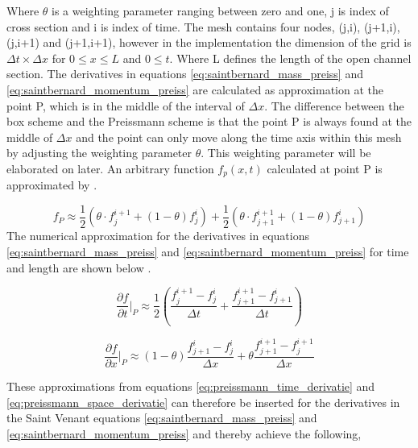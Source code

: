 Where $\theta$ is a weighting parameter ranging between zero and one, j is index of cross section and i is index of time. The mesh contains four nodes, (j,i), (j+1,i), (j,i+1) and (j+1,i+1), however in the implementation the dimension of the grid is $\Delta t \times \Delta x$ for $0 \leq x \leq L$ and $0\leq t$. Where L defines the length of the open channel section. The derivatives in equations \ref{eq:saintbernard_mass_preiss} and \ref{eq:saintbernard_momentum_preiss} are calculated as approximation at the point P, which is in the middle of the interval of $\Delta x$.%
The difference between the box scheme and the Preissmann scheme is that the point P is always found at the middle of $\Delta x$ and the point can only move along the time axis within this mesh by adjusting the weighting parameter $\theta$. This weighting parameter will be elaborated on later. An arbitrary function $f_p(x,t)$ calculated at point P is approximated by \cite{numerical_modeling}.

\begin{equation}\label{eq:approximated_function}
	f_P \approx \frac{1}{2} (\theta \cdot f_j^{i+1}+(1-\theta)f_j^i)+\frac{1}{2}(\theta\cdot f_{j+1}^{i+1}+(1-\theta)f_{j+1}^i)
\end{equation}
The numerical approximation for the derivatives in equations \ref{eq:saintbernard_mass_preiss} and \ref{eq:saintbernard_momentum_preiss} for time and length are shown below \cite{numerical_modeling}.

\begin{equation}\label{eq:preissmann_time_derivatie}
	\frac{\partial f}{\partial t}\bigg \rvert_P \approx \frac{1}{2}\left(\frac{f_j^{i+1}-f_j^i}{\Delta t}+\frac{f_{j+1}^{i+1}-f_{j+1}^i}{\Delta t}\right)
\end{equation}

\begin{equation}\label{eq:preissmann_space_derivatie}
	\frac{\partial f}{\partial x}\bigg \rvert_P \approx (1-\theta)\frac{f_{j+1}^i-f_{j}^i}{\Delta x}+\theta \frac{f_{j+1}^{i+1}-f_{j}^{i+1}}{\Delta x}
\end{equation}

These approximations from equations \ref{eq:preissmann_time_derivatie} and \ref{eq:preissmann_space_derivatie} can therefore be inserted for the derivatives in the Saint Venant equations \ref{eq:saintbernard_mass_preiss} and \ref{eq:saintbernard_momentum_preiss} and thereby achieve the following,

